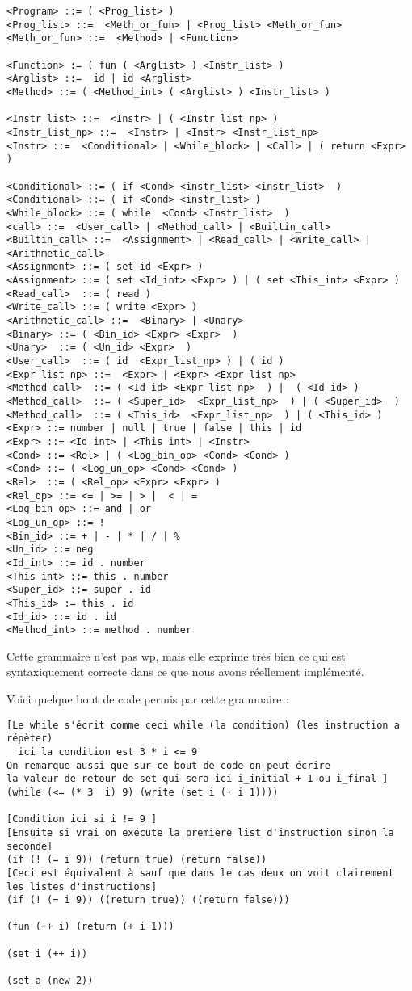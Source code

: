 \begin{verbatim}
<Program> ::= ( <Prog_list> )
<Prog_list> ::=  <Meth_or_fun> | <Prog_list> <Meth_or_fun>	
<Meth_or_fun> ::=  <Method> | <Function>

<Function> := ( fun ( <Arglist> ) <Instr_list> ) 
<Arglist> ::=  id | id <Arglist>
<Method> ::= ( <Method_int> ( <Arglist> ) <Instr_list> )
 
<Instr_list> ::=  <Instr> | ( <Instr_list_np> ) 
<Instr_list_np> ::=  <Instr> | <Instr> <Instr_list_np>
<Instr> ::=  <Conditional> | <While_block> | <Call> | ( return <Expr> ) 

<Conditional> ::= ( if <Cond> <instr_list> <instr_list>  )  
<Conditional> ::= ( if <Cond> <instr_list> )
<While_block> ::= ( while  <Cond> <Instr_list>  ) 
<call> ::=  <User_call> | <Method_call> | <Builtin_call> 
<Builtin_call> ::=  <Assignment> | <Read_call> | <Write_call> | <Arithmetic_call>
<Assignment> ::= ( set id <Expr> ) 
<Assignment> ::= ( set <Id_int> <Expr> ) | ( set <This_int> <Expr> )
<Read_call>  ::= ( read )
<Write_call> ::= ( write <Expr> )
<Arithmetic_call> ::=  <Binary> | <Unary>
<Binary> ::= ( <Bin_id> <Expr> <Expr>  )
<Unary>  ::= ( <Un_id> <Expr>  )
<User_call>  ::= ( id  <Expr_list_np> ) | ( id ) 
<Expr_list_np> ::=  <Expr> | <Expr> <Expr_list_np>
<Method_call>  ::= ( <Id_id> <Expr_list_np>  ) |  ( <Id_id> )   
<Method_call>  ::= ( <Super_id>  <Expr_list_np>  ) | ( <Super_id>  )
<Method_call>  ::= ( <This_id>  <Expr_list_np>  ) | ( <This_id> )
<Expr> ::= number | null | true | false | this | id 
<Expr> ::= <Id_int> | <This_int> | <Instr>
<Cond> ::= <Rel> | ( <Log_bin_op> <Cond> <Cond> )
<Cond> ::= ( <Log_un_op> <Cond> <Cond> )
<Rel>  ::= ( <Rel_op> <Expr> <Expr> ) 
<Rel_op> ::= <= | >= | > |  < | =
<Log_bin_op> ::= and | or
<Log_un_op> ::= !
<Bin_id> ::= + | - | * | / | %
<Un_id> ::= neg
<Id_int> ::= id . number
<This_int> ::= this . number
<Super_id> ::= super . id
<This_id> := this . id 
<Id_id> ::= id . id
<Method_int> ::= method . number
\end{verbatim}
Cette grammaire n'est pas wp, mais elle exprime très bien ce qui est syntaxiquement correcte dans ce que nous avons réellement implémenté. 

Voici quelque bout de code permis par cette grammaire :

\begin{verbatim}
[Le while s'écrit comme ceci while (la condition) (les instruction a répèter)
  ici la condition est 3 * i <= 9
On remarque aussi que sur ce bout de code on peut écrire 
la valeur de retour de set qui sera ici i_initial + 1 ou i_final ]
(while (<= (* 3  i) 9) (write (set i (+ i 1)))) 
  
[Condition ici si i != 9 ]
[Ensuite si vrai on exécute la première list d'instruction sinon la seconde]
(if (! (= i 9)) (return true) (return false))
[Ceci est équivalent à sauf que dans le cas deux on voit clairement les listes d'instructions]
(if (! (= i 9)) ((return true)) ((return false)))

(fun (++ i) (return (+ i 1)))

(set i (++ i))

(set a (new 2))
\end{verbatim}

